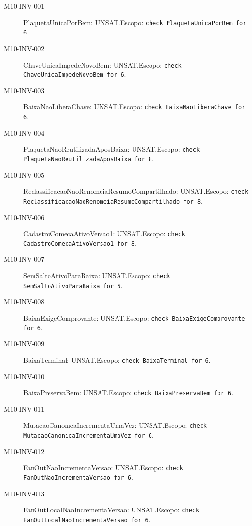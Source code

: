 \begin{description}
\item[M10-INV-001] PlaquetaUnicaPorBem: UNSAT.\newline Escopo: \texttt{check PlaquetaUnicaPorBem for 6}.
\item[M10-INV-002] ChaveUnicaImpedeNovoBem: UNSAT.\newline Escopo: \texttt{check ChaveUnicaImpedeNovoBem for 6}.
\item[M10-INV-003] BaixaNaoLiberaChave: UNSAT.\newline Escopo: \texttt{check BaixaNaoLiberaChave for 6}.
\item[M10-INV-004] PlaquetaNaoReutilizadaAposBaixa: UNSAT.\newline Escopo: \texttt{check PlaquetaNaoReutilizadaAposBaixa for 8}.
\item[M10-INV-005] ReclassificacaoNaoRenomeiaResumoCompartilhado: UNSAT.\newline Escopo: \texttt{check ReclassificacaoNaoRenomeiaResumoCompartilhado for 8}.
\item[M10-INV-006] CadastroComecaAtivoVersao1: UNSAT.\newline Escopo: \texttt{check CadastroComecaAtivoVersao1 for 8}.
\item[M10-INV-007] SemSaltoAtivoParaBaixa: UNSAT.\newline Escopo: \texttt{check SemSaltoAtivoParaBaixa for 6}.
\item[M10-INV-008] BaixaExigeComprovante: UNSAT.\newline Escopo: \texttt{check BaixaExigeComprovante for 6}.
\item[M10-INV-009] BaixaTerminal: UNSAT.\newline Escopo: \texttt{check BaixaTerminal for 6}.
\item[M10-INV-010] BaixaPreservaBem: UNSAT.\newline Escopo: \texttt{check BaixaPreservaBem for 6}.
\item[M10-INV-011] MutacaoCanonicaIncrementaUmaVez: UNSAT.\newline Escopo: \texttt{check MutacaoCanonicaIncrementaUmaVez for 6}.
\item[M10-INV-012] FanOutNaoIncrementaVersao: UNSAT.\newline Escopo: \texttt{check FanOutNaoIncrementaVersao for 6}.
\item[M10-INV-013] FanOutLocalNaoIncrementaVersao: UNSAT.\newline Escopo: \texttt{check FanOutLocalNaoIncrementaVersao for 6}.

\end{description}
